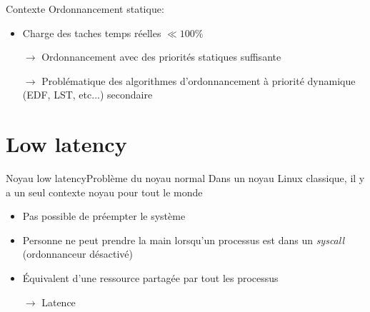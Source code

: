 \begin{frame}{Contexte}
  Ordonnancement statique:
  \begin{itemize}
    \item Charge des taches temps réelles $\ll 100\%$
    \item[$\to$]   Ordonnancement   avec   des   priorités   statiques
      suffisante
    \item[$\to$]  Problématique  des  algorithmes  d'ordonnancement  à
      priorité dynamique (EDF, LST, etc...) secondaire
  \end{itemize}
\end{frame}


\section{Low latency}

\begin{frame}{Noyau low latency}{Problème du noyau normal}
  Dans un  noyau Linux classique, il  y a un seul  contexte noyau pour
  tout le monde
  \begin{itemize}
  \item Pas possible de préempter le système
  \item Personne ne peut prendre  la main lorsqu'un processus est dans
    un \emph{syscall} (ordonnanceur désactivé)
  \item Équivalent d'une ressource partagée par tout les processus
  \item[$\to$] Latence
  \end{itemize}
\end{frame}

